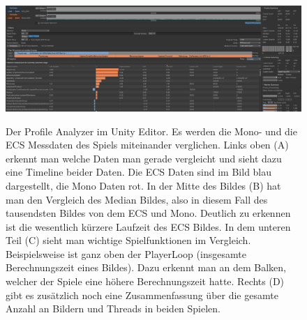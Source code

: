 \begin{figure}[H]
\centering
\begin{annotatedFigure}
	{\includegraphics[scale=0.31]{Bilder/Profile Analyzer.png}}
\end{annotatedFigure}
\caption{Der Profile Analyzer im Unity Editor. Es werden die Mono- und die ECS Messdaten des Spiels miteinander verglichen. Links oben (A) erkennt man welche Daten man gerade vergleicht und sieht dazu eine Timeline beider Daten. Die ECS Daten sind im Bild blau dargestellt, die Mono Daten rot. In der Mitte des Bildes (B) hat man den Vergleich des Median Bildes, also in diesem Fall des tausendsten Bildes von dem ECS und Mono. Deutlich zu erkennen ist die wesentlich kürzere Laufzeit des ECS Bildes. In dem unteren Teil (C) sieht man wichtige Spielfunktionen im Vergleich. Beispielsweise ist ganz oben der PlayerLoop (insgesamte Berechnungszeit eines Bildes). Dazu erkennt man an dem Balken, welcher der Spiele eine höhere Berechnungszeit hatte. Rechts (D) gibt es zusätzlich noch eine Zusammenfassung über die gesamte Anzahl an Bildern und Threads in beiden Spielen.}
\label{fig:profile_analyzer}
\end{figure}